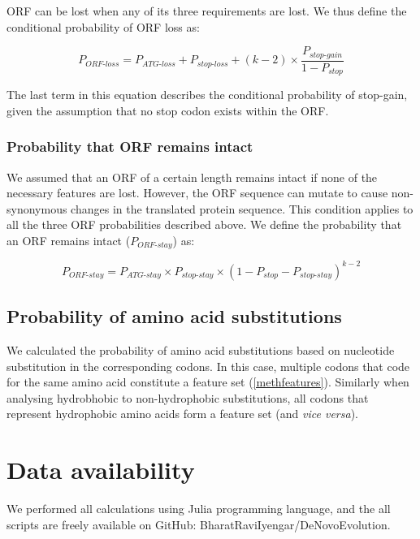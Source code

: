 \documentclass[12pt,a4paper]{article}
\begin{document}
ORF can be lost when any of its three requirements are lost. We thus define the conditional probability of ORF loss as:

\begin{equation}
P_\textit{ORF-loss} = P_\textit{ATG-loss} + P_\textit{stop-loss} + (k-2)\times \frac{P_\textit{stop-gain}}{1-P_\textit{stop}}
\label{eqorfloss}
\end{equation}

The last term in this equation describes the conditional probability of stop-gain, given the assumption that no stop codon exists within the ORF.

\subsubsection{Probability that ORF remains intact}

We assumed that an ORF of a certain length remains intact if none of the necessary features are lost. However, the ORF sequence can mutate to cause non-synonymous changes in the translated protein sequence. This condition applies to all the three ORF probabilities described above. We define the probability that an ORF remains intact ($P_\textit{ORF-stay}$) as:

\begin{equation}
P_\textit{ORF-stay} = P_\textit{ATG-stay} \times P_\textit{stop-stay} \times (1 - P_\textit{stop} - P_\textit{stop-stay})^{k-2}
\label{eqorfstay}
\end{equation}

\subsection{Probability of amino acid substitutions}

We calculated the probability of amino acid substitutions based on nucleotide substitution in the corresponding codons. In this case, multiple codons that code for the same amino acid constitute a feature set (\autoref{methfeatures}). Similarly when analysing hydrobhobic to non-hydrophobic substitutions, all codons that represent hydrophobic amino acids form a feature set (and \textit{vice versa}).

\section{Data availability}
We performed all calculations using Julia programming language, and the all scripts are freely available on GitHub: BharatRaviIyengar/DeNovoEvolution. 



\small

\end{document}
